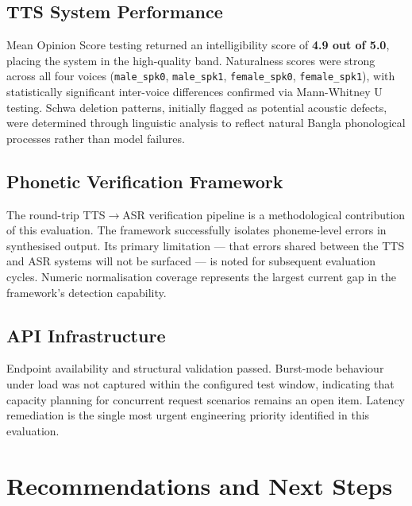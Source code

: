 \documentclass[12pt, a4paper]{article}
\begin{document}
\subsection{TTS System Performance}
Mean Opinion Score testing returned an intelligibility score of \textbf{4.9 out of 5.0}, placing the system in the high-quality band. Naturalness scores were strong across all four voices (\texttt{male\_spk0}, \texttt{male\_spk1}, \texttt{female\_spk0}, \texttt{female\_spk1}), with statistically significant inter-voice differences confirmed via Mann-Whitney U testing. Schwa deletion patterns, initially flagged as potential acoustic defects, were determined through linguistic analysis to reflect natural Bangla phonological processes rather than model failures.

\subsection{Phonetic Verification Framework}
The round-trip TTS$\rightarrow$ASR verification pipeline is a methodological contribution of this evaluation. The framework successfully isolates phoneme-level errors in synthesised output. Its primary limitation — that errors shared between the TTS and ASR systems will not be surfaced — is noted for subsequent evaluation cycles. Numeric normalisation coverage represents the largest current gap in the framework's detection capability.

\subsection{API Infrastructure}
Endpoint availability and structural validation passed. Burst-mode behaviour under load was not captured within the configured test window, indicating that capacity planning for concurrent request scenarios remains an open item. Latency remediation is the single most urgent engineering priority identified in this evaluation.

\section{Recommendations and Next Steps}
\end{document}
